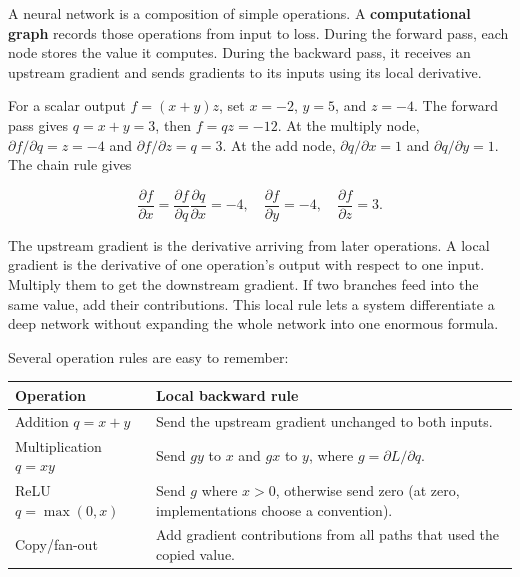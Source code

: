A neural network is a composition of simple operations. A \textbf{computational graph} records those operations from input to loss. During the forward pass, each node stores the value it computes. During the backward pass, it receives an upstream gradient and sends gradients to its inputs using its local derivative.

For a scalar output \(f=(x+y)z\), set \(x=-2\), \(y=5\), and \(z=-4\). The forward pass gives \(q=x+y=3\), then \(f=qz=-12\). At the multiply node, \(\partial f/\partial q=z=-4\) and \(\partial f/\partial z=q=3\). At the add node, \(\partial q/\partial x=1\) and \(\partial q/\partial y=1\). The chain rule gives

\[\frac{\partial f}{\partial x}=\frac{\partial f}{\partial q}\frac{\partial q}{\partial x}=-4, \quad \frac{\partial f}{\partial y}=-4, \quad \frac{\partial f}{\partial z}=3.\]

The upstream gradient is the derivative arriving from later operations. A local gradient is the derivative of one operation's output with respect to one input. Multiply them to get the downstream gradient. If two branches feed into the same value, add their contributions. This local rule lets a system differentiate a deep network without expanding the whole network into one enormous formula.

Several operation rules are easy to remember:

{\def\LTcaptype{none} %
\begin{longtable}[]{@{}
  >{\raggedright\arraybackslash}p{}
  >{\raggedright\arraybackslash}p{}@{}}
\toprule\noalign{}
\begin{minipage}[b]{\linewidth}\raggedright
Operation
\end{minipage} & \begin{minipage}[b]{\linewidth}\raggedright
Local backward rule
\end{minipage} \\
\midrule\noalign{}
\endhead
\bottomrule\noalign{}
\endlastfoot
Addition \(q=x+y\) & Send the upstream gradient unchanged to both inputs. \\
Multiplication \(q=xy\) & Send \(g y\) to \(x\) and \(g x\) to \(y\), where \(g=\partial L/\partial q\). \\
ReLU \(q=\max(0,x)\) & Send \(g\) where \(x>0\), otherwise send zero (at zero, implementations choose a convention). \\
Copy/fan-out & Add gradient contributions from all paths that used the copied value. \\
\end{longtable}
}

